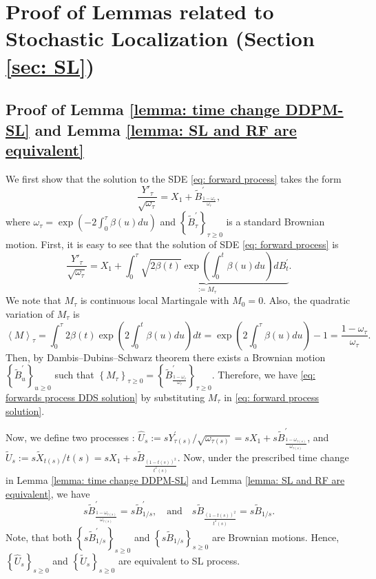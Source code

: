 \documentclass{article}
\theoremstyle{plain}
\theoremstyle{definition}
\theoremstyle{remark}
\def\innerprod#1{\left\langle#1\right\rangle}
\newcommand{\bc}[1]{\left\{{#1}\right\}}
\newcommand{\br}[1]{\left({#1}\right)}
\begin{document}
\section{Proof of Lemmas related to Stochastic Localization (Section \ref{sec: SL})}
\label{app: SL lemmas}


\subsection{Proof of Lemma \ref{lemma: time change DDPM-SL} and Lemma \ref{lemma: SL and RF are equivalent}}
\label{app: SL = RF = DDPM}
We first show that the solution to the SDE \eqref{eq: forward process} takes the  form
\begin{equation}
\label{eq: forwards process DDS solution}
 \frac{Y'_{\tau}}{\sqrt{\omega_{\tau}}} =  X_1 + \widetilde B_{\frac{1 -\omega_{\tau}}{\omega_{\tau}}}^\prime,  
\end{equation}
where $\omega_{\tau} = \exp(-2 \int_0^\tau \beta(u) du)$ and $\bc{\widetilde B^\prime_\tau}_{\tau\ge 0}$ is a standard Brownian motion. First, it is easy to see that the solution of SDE \eqref{eq: forward process} is 
\begin{equation}
\label{eq: forward process solution}
\frac{Y'_{\tau}}{\sqrt{\omega_{\tau}}} = X_1 + \underbrace{\int_0^\tau \sqrt{2 \beta(t)} \exp \br{\int_0^t \beta(u) du} dB^\prime_t}_{:= M_\tau}.
\end{equation}
We note that $M_\tau$ is continuous local Martingale with $M_0 = 0$. Also, the quadratic variation of $M_\tau$ is 
$$
\innerprod{M}_\tau = \int_{0}^\tau 2 \beta(t) \exp \br{2 \int_{0}^t \beta(u) du} dt = \exp \br{2 \int_{0}^\tau \beta(u) du} -1 = \frac{1 - \omega_\tau}{\omega_\tau}.
$$
Then, by Dambis–Dubins–Schwarz theorem \citep[Theorem 1.6]{revuz2013continuous} there exists a Brownian motion $\bc{\widetilde B_u^\prime}_{u \ge 0}$ such that $\bc{M_\tau}_{\tau \ge 0} = \bc{\widetilde B_{\frac{1 -\omega_{\tau}}{\omega_{\tau}}}^\prime}_{\tau \ge 0}$. Therefore, we have \eqref{eq: forwards process DDS solution} by substituting $M_\tau$ in \eqref{eq: forward process solution}.


Now, we define two processes : $\hat U_s:= s Y^\prime_{\tau(s)}/\sqrt{\omega_{\tau(s)}} = s X_1 + s \widetilde B^\prime_{\frac{1 - \omega_{\tau(s)}}{\omega_{\tau(s)}}}$, and $\tilde U_s := s \tilde X_{t(s)}/t(s) = s X_1 + s \tilde B_{\frac{(1-t(s))^2}{t^2(s)}}$. 
Now, under the prescribed time change in Lemma \ref{lemma: time change DDPM-SL} and Lemma \ref{lemma: SL and RF are equivalent}, we have 
\[
s \widetilde B^\prime_{\frac{1 - \omega_{\tau(s)}}{\omega_{\tau(s)}}} = s \widetilde B^\prime_{1/s}, \quad \text{and} \quad  s \tilde B_{\frac{(1-t(s))^2}{t^2(s)}} = s \tilde B_{1/s}.
\]
Note, that both $\bc{s \widetilde B^\prime_{1/s}}_{s \ge0}$ and $\bc{s \tilde B_{1/s}}_{s \ge 0}$ are Brownian motions. Hence, $\bc{\hat U_s}_{s\ge0}$ and $\bc{\tilde U_s}_{s \ge 0 }$ are equivalent to SL process.
\end{document}
